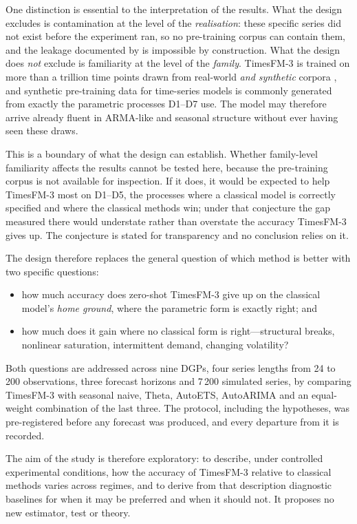 \documentclass[11pt]{article}
\begin{document}
One distinction is essential to the interpretation of the results.
What the design excludes is contamination at the level of the \emph{realisation}: these specific
series did not exist before the experiment ran, so no pre-training corpus can contain them, and
the leakage documented by \citet{meyer2025leakage} is impossible by construction. What the design
does \emph{not} exclude is familiarity at the level of the \emph{family}. TimesFM-3 is trained on
more than a trillion time points drawn from real-world \emph{and synthetic} corpora
\citep{timesfm3blog}, and synthetic pre-training data for time-series models is commonly
generated from exactly the parametric processes D1--D7 use. The model may therefore arrive
already fluent in ARMA-like and seasonal structure without ever having seen these draws.

This is a boundary of what the design can establish. Whether family-level familiarity affects
the results cannot be tested here, because the pre-training corpus is not available for
inspection. If it does, it would be expected to help TimesFM-3 most on D1--D5, the processes where
a classical model is correctly specified and where the classical methods win; under that
conjecture the gap measured there would understate rather than overstate the accuracy TimesFM-3
gives up. The conjecture is stated for transparency and no conclusion relies on it.

The design therefore replaces the general question of which method is better with two specific
questions:

\begin{itemize}
\item how much accuracy does zero-shot TimesFM-3 give up on the classical model's
      \emph{home ground}, where the parametric form is exactly right; and
\item how much does it gain where no classical form is right---structural breaks,
      nonlinear saturation, intermittent demand, changing volatility?
\end{itemize}

Both questions are addressed across nine DGPs, four series lengths from 24 to 200
observations, three forecast horizons and 7\,200 simulated series, by comparing TimesFM-3 with seasonal naive, Theta,
AutoETS, AutoARIMA and an equal-weight combination of the last three. The protocol, including
the hypotheses, was pre-registered before any forecast was produced, and every departure from
it is recorded.

The aim of the study is therefore exploratory: to describe, under controlled experimental
conditions, how the accuracy of TimesFM-3 relative to classical methods varies across regimes, and
to derive from that description diagnostic baselines for when it may be preferred and when it
should not. It proposes no new estimator, test or theory.
\end{document}
